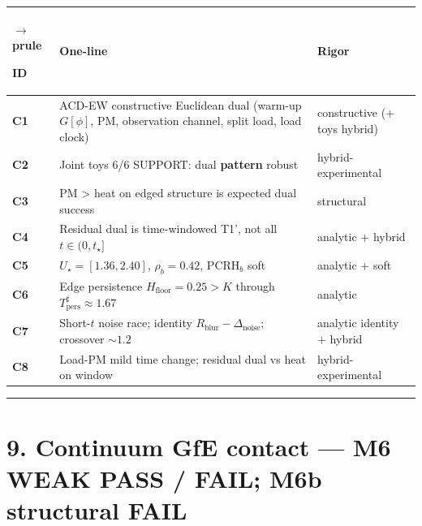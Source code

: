 \documentclass[
  11pt,
]{article}
\newcounter{none} %
\begin{document}
{\def\LTcaptype{none} %
\begin{longtable}[]{@{}
  >{\raggedright\arraybackslash}p{}
  >{\raggedright\arraybackslash}p{}
  >{\raggedright\arraybackslash}p{}@{}}
$\rightarrow$prule\noalign{}
\begin{minipage}[b]{\linewidth}\raggedright
ID
\end{minipage} & \begin{minipage}[b]{\linewidth}\raggedright
One-line
\end{minipage} & \begin{minipage}[b]{\linewidth}\raggedright
Rigor
\end{minipage} \\
\midrule\noalign{}
\endhead
\bottomrule\noalign{}
\endlastfoot
\textbf{C1} & ACD-EW constructive Euclidean dual (warm-up \(G[\phi]\), PM, observation channel, split load, load clock) & constructive (+ toys hybrid) \\
\textbf{C2} & Joint toys 6/6 SUPPORT: dual \textbf{pattern} robust & hybrid-experimental \\
\textbf{C3} & PM \textgreater{} heat on edged structure is expected dual success & structural \\
\textbf{C4} & Residual dual is time-windowed T1', not all \(t\in(0,t_\star]\) & analytic + hybrid \\
\textbf{C5} & \(U_\star=[1.36,2.40]\), \(\rho_b=0.42\), PCRH\(_b\) soft & analytic + soft \\
\textbf{C6} & Edge persistence \(H_{\mathrm{floor}}=0.25>K\) through \(T_{\mathrm{pers}}^\sharp\approx 1.67\) & analytic \\
\textbf{C7} & Short-\(t\) noise race; identity \(R_{\mathrm{blur}}-\Delta_{\mathrm{noise}}\); crossover \(\sim 1.2\) & analytic identity + hybrid \\
\textbf{C8} & Load-PM mild time change; residual dual vs heat on window & hybrid-experimental \\
\end{longtable}
}

\begin{center}\rule{0.5\linewidth}{0.5pt}\end{center}

\section{9. Continuum GfE contact --- M6 WEAK PASS / FAIL; M6b structural FAIL}\label{continuum-gfe-contact-m6-weak-pass-fail-m6b-structural-fail}
\end{document}
